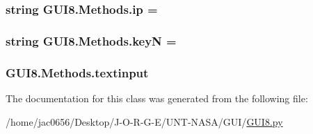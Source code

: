 \subsubsection[{\texorpdfstring{ip}{ip}}]{\setlength{\rightskip}{0pt plus 5cm}string G\+U\+I8.\+Methods.\+ip = \textquotesingle{}\textquotesingle{}\hspace{0.3cm}{\ttfamily [static]}}\hypertarget{classGUI8_1_1Methods_ac5aeb0c519d44173e630d3043630d6b5}{}\label{classGUI8_1_1Methods_ac5aeb0c519d44173e630d3043630d6b5}
\subsubsection[{\texorpdfstring{keyN}{keyN}}]{\setlength{\rightskip}{0pt plus 5cm}string G\+U\+I8.\+Methods.\+keyN = \textquotesingle{}\textquotesingle{}\hspace{0.3cm}{\ttfamily [static]}}\hypertarget{classGUI8_1_1Methods_a8525f729863e89dd50a9f74cdea594d7}{}\label{classGUI8_1_1Methods_a8525f729863e89dd50a9f74cdea594d7}
\subsubsection[{\texorpdfstring{textinput}{textinput}}]{\setlength{\rightskip}{0pt plus 5cm}G\+U\+I8.\+Methods.\+textinput}\hypertarget{classGUI8_1_1Methods_a2aa43992fb1cab1c4d8d542b047ee088}{}\label{classGUI8_1_1Methods_a2aa43992fb1cab1c4d8d542b047ee088}


The documentation for this class was generated from the following file\+:\begin{DoxyCompactItemize}
\item 
/home/jac0656/\+Desktop/\+J-\/\+O-\/\+R-\/\+G-\/\+E/\+U\+N\+T-\/\+N\+A\+S\+A/\+G\+U\+I/\hyperlink{GUI8_8py}{G\+U\+I8.\+py}\end{DoxyCompactItemize}
